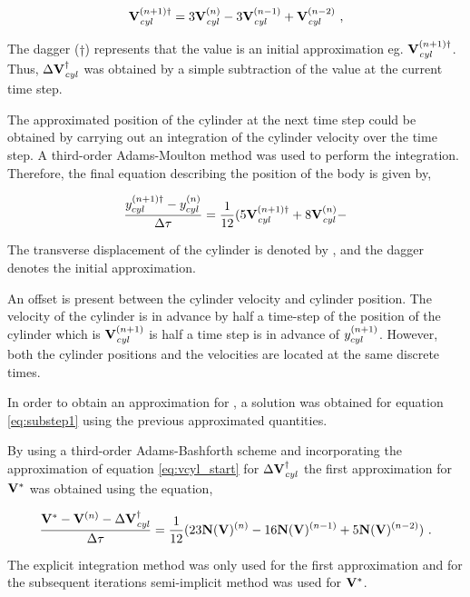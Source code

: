  
\begin{equation} \centering
\label{eq:vcyl_start}
\Vcyl^{(n+1)\dag} = 3\Vcyl^{(n)} - 3\Vcyl^{(n-1)} + \Vcyl^{(n-2)} ~,
\end{equation}


The dagger ($\dag$) represents that the value is an initial approximation eg. $\mathbf{V}_{\mathit{cyl}}^{(n+1)\dag}$. Thus, $\Delta\mathbf{V}_{\mathit{cyl}}^{\dag}$ was obtained by a simple subtraction of the value at the current time step. 

The approximated position of the cylinder at the next time step could be obtained by carrying out an integration of the cylinder velocity over the time step. A third-order Adams-Moulton method was used to perform the integration. Therefore, the final equation describing the position of the body is given by, 

\begin{equation} \centering
	\label{eq:ycyl_start}
	\frac{\ycyl^{(n+1)\dag} - \ycyl^{(n)}}{\Delta\tau} = \frac{1}{12}(5\Vcyl^{(n+1)\dag} + 8\Vcyl^{(n)} -  
\end{equation}

The transverse displacement of the cylinder is denoted by \ycyl, and the dagger denotes the initial approximation.

An offset is present between the cylinder velocity and cylinder position. The velocity of the cylinder is in advance by half a time-step of the position of the cylinder which is $\mathbf{V}_{\mathit{cyl}}^{(n+1)}$ is half a time step is in advance of $y_{cyl}^{(n+1)}$. However, both the cylinder positions and the velocities are located at the same discrete times.

In order to obtain an approximation for \Vint, a solution was obtained for equation \ref{eq:substep1} using the previous approximated quantities.

By using a third-order Adams-Bashforth scheme and incorporating the approximation of equation \ref{eq:vcyl_start} for  $\Delta\mathbf{V}_{\mathit{cyl}}^{\dag}$ the first approximation for $\mathbf{V}^{*}$ was obtained using the equation,
 
\begin{equation} \centering
\label{eq:vint_first}
\frac{\Vint - \Vn - \Delta\Vcyl^{\dag}}{\Delta\tau} = \frac{1}{12}(23\mathbf{N}(\vecV)^{(n)} - 16\mathbf{N}(\vecV)^{(n-1)} + 5\mathbf{N}(\vecV)^{(n-2)}) ~.
\end{equation}

The explicit integration method was only used for the first approximation and for the subsequent iterations semi-implicit method was used for $\mathbf{V}^{*}$.

